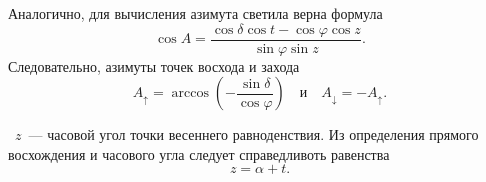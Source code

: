Аналогично, для вычисления азимута светила верна формула
\begin{equation}
\cos A=\frac{\cos\delta\cos t-\cos\varphi\cos z}{\sin\varphi\sin z}.
\end{equation}
Следовательно, азимуты точек восхода и захода
\begin{equation}
	A_\uparrow = \arccos \left(-\dfrac{\sin\delta}{\cos \varphi} \right)\quad\text{и}\quad A_\downarrow = - A_\uparrow.
\end{equation}

~$z$~--- часовой угол точки весеннего равноденствия. Из определения прямого восхождения и часового угла следует справедливоть равенства\begin{equation}
z = \alpha + t.
\end{equation}